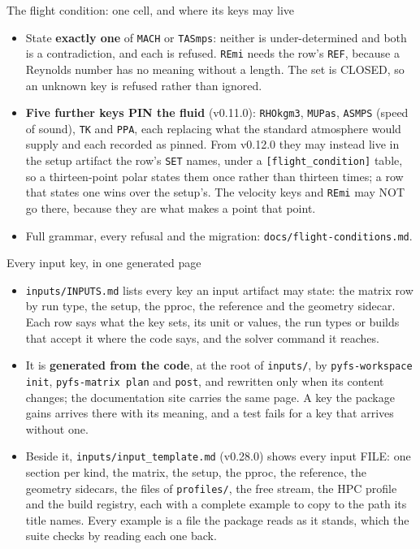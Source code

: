 \documentclass[aspectratio=169,10pt]{beamer}
\newcommand{\code}[1]{\texttt{\small #1}}
\begin{document}
\begin{frame}{The flight condition: one cell, and where its keys may live}
\begin{itemize}
    \item State \textbf{exactly one} of \code{MACH} or \code{TASmps}: neither is under-determined and both is a contradiction, and each is refused. \code{REmi} needs the row's \code{REF}, because a Reynolds number has no meaning without a length. The set is CLOSED, so an unknown key is refused rather than ignored.
    \item \textbf{Five further keys PIN the fluid} (v0.11.0): \code{RHOkgm3}, \code{MUPas}, \code{ASMPS} (speed of sound), \code{TK} and \code{PPA}, each replacing what the standard atmosphere would supply and each recorded as pinned. From v0.12.0 they may instead live in the setup artifact the row's \code{SET} names, under a \code{[flight\_condition]} table, so a thirteen-point polar states them once rather than thirteen times; a row that states one wins over the setup's. The velocity keys and \code{REmi} may NOT go there, because they are what makes a point that point.
    \item Full grammar, every refusal and the migration: \code{docs/flight-conditions.md}.
  \end{itemize}
\end{frame}

\begin{frame}{Every input key, in one generated page}
  \begin{itemize}
    \item \code{inputs/INPUTS.md} lists every key an input artifact may state: the matrix row by run type, the setup, the pproc, the reference and the geometry sidecar. Each row says what the key sets, its unit or values, the run types or builds that accept it where the code says, and the solver command it reaches.
    \item It is \textbf{generated from the code}, at the root of \code{inputs/}, by \code{pyfs-workspace init}, \code{pyfs-matrix plan} and \code{post}, and rewritten only when its content changes; the documentation site carries the same page. A key the package gains arrives there with its meaning, and a test fails for a key that arrives without one.
    \item Beside it, \code{inputs/input\_template.md} (v0.28.0) shows every input FILE: one section per kind, the matrix, the setup, the pproc, the reference, the geometry sidecars, the files of \code{profiles/}, the free stream, the HPC profile and the build registry, each with a complete example to copy to the path its title names. Every example is a file the package reads as it stands, which the suite checks by reading each one back.
  \end{itemize}
\end{frame}
\end{document}
